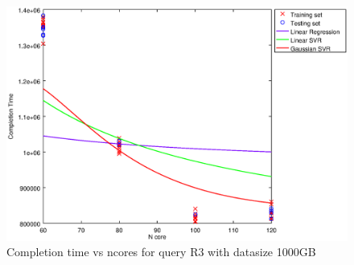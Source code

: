 
\begin {figure}[hbtp]
\centering
\includegraphics[width=\textwidth]{output/R3_1000_1_OVER_NCORES/plot_R3_1000_bestmodels.eps}
\caption{Completion time vs ncores for query R3 with datasize 1000GB}
\label{fig:all_nonlinear_R3_1000}
\end {figure}
